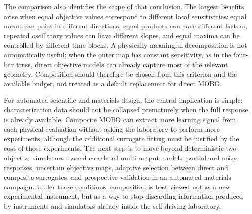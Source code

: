 \documentclass{article}
\begin{document}
The comparison also identifies the scope of that conclusion.  The largest
benefits arise when equal objective values correspond to different local
sensitivities: equal norms can point in different directions, equal products
can have different factors, repeated oscillatory values can have different
slopes, and equal maxima can be controlled by different time blocks.  A
physically meaningful decomposition is not automatically useful; when the
outer map has constant sensitivity, as in the four-bar truss, direct objective
models can already capture most of the relevant geometry.  Composition should
therefore be chosen from this criterion and the available budget, not treated
as a default replacement for direct MOBO.

For automated scientific and materials design, the central implication is
simple: characterization data should not be collapsed prematurely when the
full response is already available.  Composite MOBO can extract more learning
signal from each physical evaluation without asking the laboratory to perform
more experiments, although the additional surrogate fitting must be justified
by the cost of those experiments.  The next step is to move beyond
deterministic two-objective simulators toward correlated multi-output models,
partial and noisy responses, uncertain objective maps, adaptive selection
between direct and composite surrogates, and prospective validation in an
automated materials campaign.  Under those conditions, composition is best
viewed not as a new experimental instrument, but as a way to stop discarding
information produced by instruments and simulators already inside the
self-driving laboratory.
\end{document}
